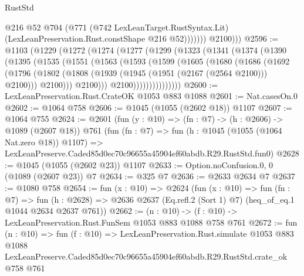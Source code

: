 \begin{lexlean}{RustStd}
\begin{coremodule}
                    @216
                    @52
                    @704
                    (@771
                      (@742 LexLeanTarget.RustSyntax.Lit)
                      (LexLeanPreservation.Rust.constShape @216 @52)))))))
          @2100)))
@2596 := @1103
    (@1229
      (@1272
        (@1274
          (@1277
            (@1299
              (@1323
                (@1341
                  (@1374
                    (@1390
                      (@1395
                        (@1535
                          (@1551
                            (@1563
                              (@1593
                                (@1599
                                  (@1605
                                    (@1680
                                      (@1686
                                        (@1692
                                          (@1796
                                            (@1802
                                              (@1808
                                                (@1939 (@1945 (@1951 (@2167 (@2564 @2100))) @2100)))
                                              @2100)))
                                        @2100)))
                                  @2100)))))))))))))))
@2600 := LexLeanPreservation.Rust.CrateOK @1053 @883 @1088
@2601 := Nat.casesOn.{0}
@2602 := @1064 @758
@2606 := @1045 (@1055 (@2602 @18)) @1107
@2607 := @1064 @755
@2624 := @2601
    (fun (y : @10) => (fn : @7) -> (h : @2606) -> @1089 (@2607 @18))
    @761
    (fun (fn : @7) =>
    fun (h : @1045 (@1055 (@1064 Nat.zero @18)) @1107) =>
    LexLeanPreserve.Caded85d0ec70c96655a45904ef60abdb.R29.RustStd.fun0)
@2628 := @1045 (@1055 (@2602 @23)) @1107
@2633 := Option.noConfusion.{0, 0} (@1089 (@2607 @23)) @7
@2634 := @325 @7
@2636 := @2633 @2634 @7
@2637 := @1080 @758
@2654 := fun (x : @10) =>
  @2624
    (fun (x : @10) =>
    fun (fn : @7) =>
    fun (h : @2628) => @2636 @2637 (Eq.refl.{2} (Sort 1) @7) (heq_of_eq.{1} @1044 @2634 @2637 @761))
@2662 := (n : @10) -> (f : @10) -> LexLeanPreservation.Rust.FunSem @1053 @883 @1088 @758 @761
@2672 := fun (n : @10) =>
  fun (f : @10) =>
  LexLeanPreservation.Rust.simulate
    @1053
    @883
    @1088
    LexLeanPreserve.Caded85d0ec70c96655a45904ef60abdb.R29.RustStd.crate_ok
    @758
    @761
\end{coremodule}
\end{lexlean}
